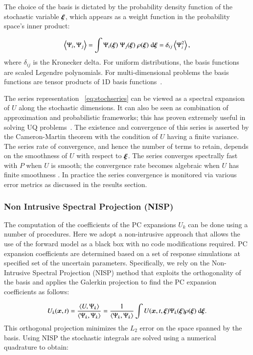 The choice of the basis is dictated by the probability density
function of the stochastic variable $\xxi$, which appears as a weight
function in the probability space's inner product:

\begin{equation}
 \left<\Psi_i,\Psi_j\right> = \int \Psi_i(\xxi) \;\Psi_j(\xxi) \; \rho(\xxi) \; \mbox{d}\xxi=\delta_{ij}\ave{\Psi_i^2},
\label{eq:inner}
\end{equation}
where $\delta_{ij}$ is the Kronecker delta.
For uniform
distributions, the basis functions are scaled Legendre polynomials.
For multi-dimensional problems the basis functions are
tensor products of 1D basis functions~\cite{LeMaitreKnio2010}.

The series representation ~\eqref{eq:stochseries} can be viewed as a spectral expansion
of $U$ along the stochastic dimensions. It can also be seen as
combination of approximation and probabilistic frameworks; this
 has proven extremely useful in solving UQ problems~\cite{Xiu:2003,Lin2009}. The existence and convergence of this series is asserted by the Cameron-Martin theorem \citep{Cameron:1947} with the condition of $U$ having a finite variance.
The series rate of convergence, and hence the number of terms to retain, depends on the smoothness of
$U$ with respect to $\xxi$. The series converges spectrally fast with $P$
when $U$ is smooth; the convergence rate becomes algebraic
when $U$ has finite smoothness \citep{Canuto:2006}. In practice the series convergence is monitored 
via various error metrics as discussed in the results section.

\subsubsection{Non Intrusive Spectral Projection (NISP)}
The computation of the coefficients of the PC expansions $U_k$
can be done using a number of procedures. Here we adopt a non-intrusive
approach that allows the use of the forward model \geoclaw as a black box
with no code modifications required. PC expansion coefficients are determined
based on a set of response \geoclaw simulations at specified set of the uncertain parameters. 
Specifically, we rely on the Non-Intrusive Spectral Projection (NISP) method that exploits the orthogonality of the basis and applies the Galerkin projection to find the PC expansion coefficients as follows:

\begin{equation}
 U_k(\bm{x},t) = \frac{\left< U, \Psi_k \right>}{\left< \Psi_k, \Psi_k \right>} = 
 \frac{1}{\left< \Psi_k, \Psi_k \right>} 
 \int U(\bm{x},t,\xxi) \Psi_k(\xxi) \rho(\xxi) \mbox{ d}\xxi.
\end{equation}
This orthogonal projection minimizes the $L_2$ error on the space spanned by the basis.
Using NISP the stochastic integrals are solved using a numerical quadrature to obtain:

